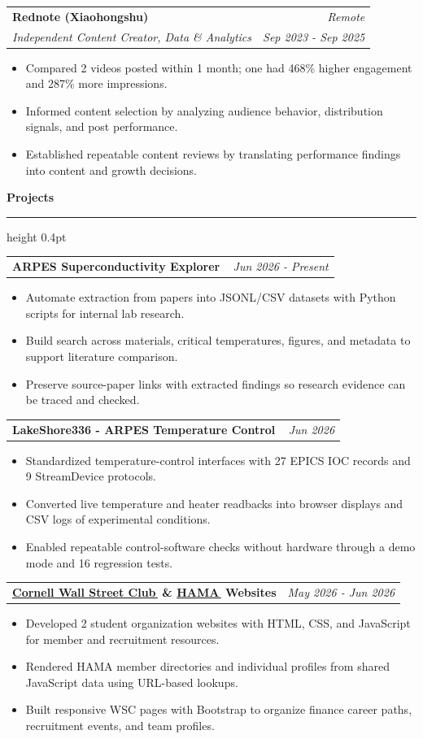 \documentclass[10pt,letterpaper]{article}
\makeatletter
\newcommand{\resumeSection}[1]{%
  \vspace{3pt}
  {\fontsize{10}{12}\selectfont\bfseries #1}\par
  \vspace{2pt}
  \hrule height 0.4pt
  \vspace{3pt}
}
\newcommand{\resumeEntry}[4]{%
  \hspace{6.7pt}\begin{tabular*}{\dimexpr\textwidth-13.4pt}{@{\extracolsep{\fill}} l r}
    \textbf{#1} & \textit{#2} \\
    \textit{#3} & \textit{#4} \\
  \end{tabular*}
  \par\vspace{-2pt}
}
\newcommand{\projectEntry}[2]{%
  \hspace{6.7pt}\begin{tabular*}{\dimexpr\textwidth-13.4pt}{@{\extracolsep{\fill}} l r}
    \textbf{#1} & \textit{#2} \\
  \end{tabular*}
  \par\vspace{-2pt}
}
\newenvironment{resumeBullets}{%
  \begin{itemize}[leftmargin=28pt,rightmargin=6.7pt,label=$\circ$,labelsep=4pt,itemsep=0pt,topsep=0pt,parsep=0pt,partopsep=0pt]
}{%
  \end{itemize}
  \vspace{0pt}
}
\newcommand{\resumeItem}[1]{\item #1}
\makeatother
\begin{document}
\resumeEntry{Rednote (Xiaohongshu)}{Remote}{Independent Content Creator, Data \& Analytics}{Sep 2023 - Sep 2025}
\begin{resumeBullets}
  \resumeItem{Compared 2 videos posted within 1 month; one had 468\% higher engagement and 287\% more impressions.}
  \resumeItem{Informed content selection by analyzing audience behavior, distribution signals, and post performance.}
  \resumeItem{Established repeatable content reviews by translating performance findings into content and growth decisions.}
\end{resumeBullets}
\resumeSection{Projects}
\projectEntry{ARPES Superconductivity Explorer\,\href{https://github.com/cocoyou123456789-sketch/data/tree/main/arpes_lit_extractor}{\raisebox{0.05ex}{\fontsize{9}{9}\selectfont\faExternalLink*}}}{Jun 2026 - Present}
\begin{resumeBullets}
  \resumeItem{Automate extraction from papers into JSONL/CSV datasets with Python scripts for internal lab research.}
  \resumeItem{Build search across materials, critical temperatures, figures, and metadata to support literature comparison.}
  \resumeItem{Preserve source-paper links with extracted findings so research evidence can be traced and checked.}
\end{resumeBullets}
\vspace{4pt}
\projectEntry{LakeShore336 - ARPES Temperature Control\,\href{https://github.com/Debye-T3/LakeShore336}{\raisebox{0.05ex}{\fontsize{9}{9}\selectfont\faExternalLink*}}}{Jun 2026}
\begin{resumeBullets}
  \resumeItem{Standardized temperature-control interfaces with 27 EPICS IOC records and 9 StreamDevice protocols.}
  \resumeItem{Converted live temperature and heater readbacks into browser displays and CSV logs of experimental conditions.}
  \resumeItem{Enabled repeatable control-software checks without hardware through a demo mode and 16 regression tests.}
\end{resumeBullets}
\vspace{4pt}
\projectEntry{\href{https://www.cornell-wsc.com}{Cornell Wall Street Club\,\faExternalLink*} \& \href{https://cornellhama.com}{HAMA\,\faExternalLink*} Websites}{May 2026 - Jun 2026}
\begin{resumeBullets}
  \resumeItem{Developed 2 student organization websites with HTML, CSS, and JavaScript for member and recruitment resources.}
  \resumeItem{Rendered HAMA member directories and individual profiles from shared JavaScript data using URL-based lookups.}
  \resumeItem{Built responsive WSC pages with Bootstrap to organize finance career paths, recruitment events, and team profiles.}
\end{resumeBullets}
\end{document}

